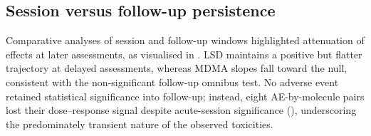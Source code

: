 \subsection{Session versus follow-up persistence}
Comparative analyses of session and follow-up windows highlighted attenuation of effects at later assessments, as visualised in . LSD maintains a positive but flatter trajectory at delayed assessments, whereas MDMA slopes fall toward the null, consistent with the non-significant follow-up omnibus test. No adverse event retained statistical significance into follow-up; instead, eight AE-by-molecule pairs lost their dose--response signal despite acute-session significance (), underscoring the predominately transient nature of the observed toxicities.


